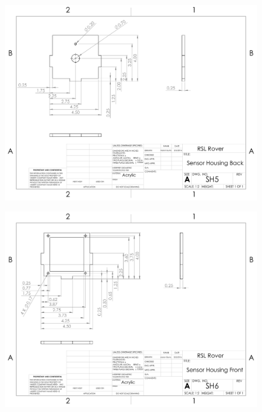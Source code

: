 \begin{figure}[H]
	\centerline{\includegraphics[angle=90,width=1.1\linewidth]{dwgs/SH5.pdf}}
\end{figure}

\begin{figure}[H]
	\centerline{\includegraphics[angle=90,width=1.1\linewidth]{dwgs/SH6.pdf}}
\end{figure}

